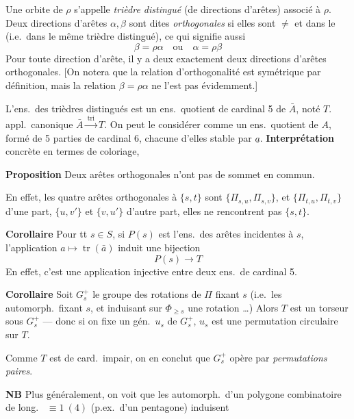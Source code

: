 \documentclass[11pt,a4paper]{article}
\begin{document}
Une orbite de $\rho$ s'appelle \emph{trièdre distingué} (de directions
d'arêtes) associé à $\rho$. Deux directions d'arêtes $\alpha, \beta$ sont
dites \emph{orthogonales} si elles sont $\neq$ et dans le 
 (i.e.\ dans le même trièdre distingué), ce qui
signifie aussi
\[
  \beta = \rho\alpha \quad \text{ou} \quad \alpha = \rho\beta
\]
Pour toute  direction d'arête, il y a deux
exactement deux directions d'arêtes orthogonales. [On notera que la
relation d'orthogonalité est symétrique par définition, mais la relation
$\beta = \rho\alpha$  ne l'est pas
évidemment.]

L'ens.\ des trièdres distingués est un ens.\ quotient de
cardinal 5 de $\bar A$, noté \struck{\ill{}} $T$.  appl.\ canonique
$\bar A \xrightarrow{\ \mathrm{tri}\ } T$. On peut le considérer comme un
ens.\ quotient de $A$, formé de 5 parties de cardinal 6,
chacune d'elles stable par $\underline{a}$.
\textbf{Interprétation} concrète en termes de coloriage,

\textbf{Proposition}  Deux arêtes orthogonales n'ont pas de
sommet en commun.

En effet, les quatre arêtes orthogonales à
$\{s, t\}$ sont $\{\Pi_{s,u}, \Pi_{s,v}\}$, et $\{\Pi_{t,u}, \Pi_{t,v}\}$ d'une part,
$\{u, v'\}$ et $\{v, u'\}$ d'autre part, elles ne rencontrent pas $\{s, t\}$.

\textbf{Corollaire} Pour tt $s \in S$, si $P(s)$ est l'ens.\ des arêtes
incidentes à $s$,  l'application
$a \mapsto \operatorname{tr}(\bar a)$ induit une bijection
\[
  P(s) \longrightarrow T
\]
En effet, c'est une application injective entre deux ens.\ de cardinal 5.

\textbf{Corollaire} Soit $G_s^+$ le groupe des rotations de $\Pi$ fixant
$s$ (i.e.\ les automorph.\ fixant $s$, et induisant sur $\Phi_{\geq s}$ une
rotation …) Alors  $T$ est un torseur sous $G_s^+$ ---
donc si on fixe un gén.\ $u_s$ de $G_s^+$, $u_s$ est une permutation
circulaire sur $T$.

Comme $T$ est de card.\ impair, on en conclut que $G_s^+$ opère par
\emph{permutations paires}.

\textbf{NB} Plus généralement, on voit que les automorph.\ d'un polygone
combinatoire de long.\ 
$\equiv 1\ (4)$ (p.ex.\ d'un pentagone) induisent
\end{document}
